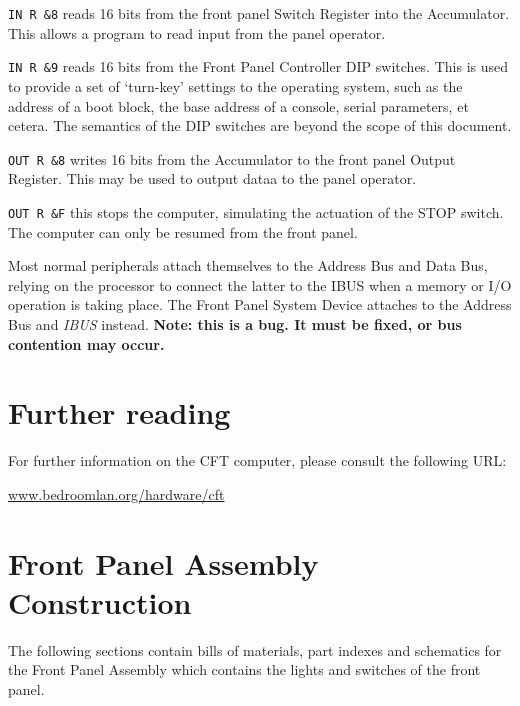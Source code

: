 \documentclass[11pt,a4paper,twocolumns]{article}
\newcommand\link[1]{\sf\href{http://#1}{#1}}
\newcommand{\asm}[1]{\texttt{#1}}
\newcommand{\sw}[1]{\textsf{#1}}
\newcommand\bus[1]{{#1}}
\newcommand\IBUS{\bus{IBUS}}
\newcommand\caution[1]{\textcolor{caution}{\bf{#1}}}
\begin{document}
\begin{description}
\item{{\asm{IN R \&8}}} reads 16 bits from the front panel Switch Register into the
  Accumulator. This allows a program to read input from the panel operator.
\item{\asm{IN R \&9}} reads 16 bits from the Front Panel Controller DIP
  switches. This is used to provide a set of ‘turn-key’ settings to the
  operating system, such as the address of a boot block, the base address of a
  console, serial parameters, et cetera. The semantics of the DIP switches are
  beyond the scope of this document.
\item{\asm{OUT R \&8}} writes 16 bits from the Accumulator to the front panel
  Output Register. This may be used to output dataa to the panel operator.
\item{\asm{OUT R \&F}} this stops the computer, simulating the actuation of the
  \sw{STOP} switch. The computer can only be resumed from the front panel.
\end{description}

Most normal peripherals attach themselves to the Address Bus and Data Bus,
relying on the processor to connect the latter to the \IBUS{} when a memory or
I/O operation is taking place. The Front Panel System Device attaches to the
Address Bus and {\em \IBUS{}\/} instead. \caution{Note: this is a bug. It must
  be fixed, or bus contention may occur.}

\section{Further reading}

For further information on the CFT computer, please consult the following URL:

\begin{center}
\link{www.bedroomlan.org/hardware/cft}
\end{center}


\clearpage
\appendix
\onecolumn

\section{Front Panel Assembly Construction}

The following sections contain bills of materials, part indexes and schematics
for the Front Panel Assembly which contains the lights and switches of the
front panel.
\end{document}
